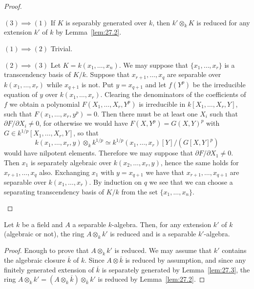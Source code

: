 \documentclass[../main]{subfiles}
\begin{document}
\begin{proof}\phantom{,}
\begin{implyenumerate}
    \item[$(3) \implies (1)$] If $K$ is separably generated over $k$, then $k' \otimes_k K$ is reduced for any extension $k'$ of $k$ by Lemma~\ref{lem:27.2}.
    \item[$(1) \implies (2)$] Trivial.
    \item[$(2) \implies (3)$] Let $K = k(x_1, \ldots, x_n)$. We may suppose that $\{x_1, \ldots, x_r\}$ is a transcendency basis of $K/k$. Suppose that $x_{r + 1}, \ldots, x_q$ are separable over $k(x_1, \ldots, x_r)$ while $x_{q + 1}$ is not. Put $y = x_{q + 1}$ and let $f(Y^p)$ be the irreducible equation of $y$ over $k(x_1, \ldots, x_r)$. Clearing the denominators of the coefficients of $f$ we obtain a polynomial $F(X_1, \ldots, X_r, Y^p)$ is irreducible in $k[X_1, \ldots, X_r, Y]$, such that $F(x_1, \ldots, x_r, y^p) = 0$. Then there must be at least one $X_i$ such that $\partial F/\partial X_i \ne 0$, for otherwise we would have $F(X, Y^p) = G(X, Y)^p$ with $G \in k^{1/p}[X_1, \ldots, X_r, Y]$, so that \[k(x_1, \ldots, x_r, y) \otimes_k k^{1/p} \simeq k^{1/p}(x_1, \ldots, x_r)[Y]/(G[X,Y]^p)\] would have nilpotent elements. Therefore we may suppose that \newline $\partial F/\partial X_1 \ne 0$. Then $x_1$ is separately algebraic over $k(x_2, \ldots, x_r, y)$, hence the same holds for $x_{r + 1}, \ldots, x_q$ also. Exchanging $x_1$ with $y = x_{q + 1}$ we have that $x_{r + 1}, \ldots, x_{q + 1}$ are separable over $k(x_1, \ldots, x_r)$. By induction on $q$ we see that we can choose a separating transcendency basis of $K/k$ from the set $\{x_1, \ldots, x_n\}$. 
\end{implyenumerate}
\end{proof}

\begin{parproposition}
Let $k$ be a field and $A$ a separable $k$-algebra. Then, for any extension $k'$ of $k$ (algebraic or not), the ring $A \otimes_k k'$ is reduced and is a separable $k'$-algebra. 
\end{parproposition}

\begin{proof}
Enough to prove that $A \otimes_k k'$ is reduced. We may assume that $k'$ contains the algebraic closure $\overline k$ of $k$. Since $A \otimes \overline k$ is reduced by assumption, and since any finitely generated extension of $\overline k$ is separately generated by Lemma~\ref{lem:27.3}, the ring $A \otimes_k k' = (A \otimes_k \overline k) \otimes_{\overline k} k'$ is reduced by Lemma~\ref{lem:27.2}. 
\end{proof}
\end{document}
